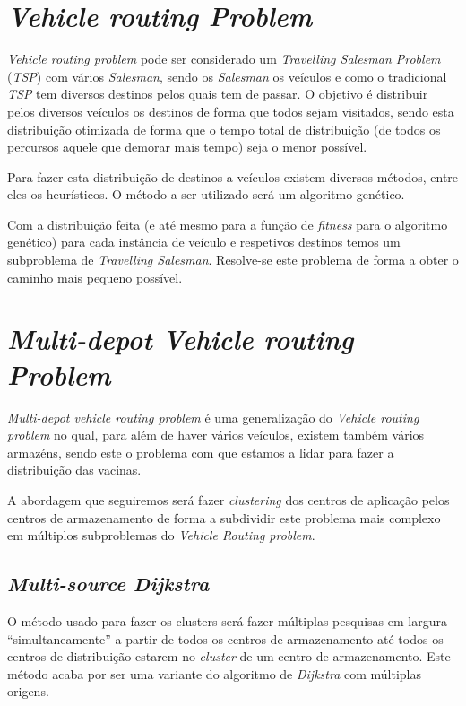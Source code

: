 \documentclass[12pt,a4paper]{report}
\begin{document}
	
	\section{\textit{Vehicle routing Problem}}
	\textit{Vehicle routing problem} pode ser considerado um \textit{Travelling Salesman Problem} (\textit{TSP}) com vários \textit{Salesman}, sendo os \textit{Salesman} os veículos e como o tradicional \textit{TSP} tem diversos destinos pelos quais tem de passar. O objetivo é distribuir pelos diversos veículos os destinos de forma que todos sejam visitados, sendo esta distribuição otimizada de forma que o tempo total de distribuição (de todos os percursos aquele que demorar mais tempo) seja o menor possível. \par
	Para fazer esta distribuição de destinos a veículos existem diversos métodos, entre eles os heurísticos. O método a ser utilizado será um algoritmo genético. \par
	Com a distribuição feita (e até mesmo para a função de \textit{fitness} para o algoritmo genético) para cada instância de veículo e respetivos destinos temos um subproblema de \textit{Travelling Salesman}. Resolve-se este problema de forma a obter o caminho mais pequeno possível.
	
	
	\section{\textit{Multi-depot Vehicle routing Problem}}
	\textit{Multi-depot vehicle routing problem} é uma generalização do \textit{Vehicle routing problem} no qual, para além de haver vários veículos, existem também vários armazéns, sendo este o problema com que estamos a lidar para fazer a distribuição das vacinas. \par
	A abordagem que seguiremos será fazer \textit{clustering} dos centros de aplicação pelos centros de armazenamento de forma a subdividir este problema mais complexo em múltiplos subproblemas do \textit{Vehicle Routing problem}. \par
	
		\subsection{\textit{Multi-source Dijkstra}}
		O método usado para fazer os clusters será fazer múltiplas pesquisas em largura “simultaneamente” a partir de todos os centros de armazenamento até todos os centros de distribuição estarem no \textit{cluster} de um centro de armazenamento. Este método acaba por ser uma variante do algoritmo de \textit{Dijkstra} com múltiplas origens.
\end{document}

